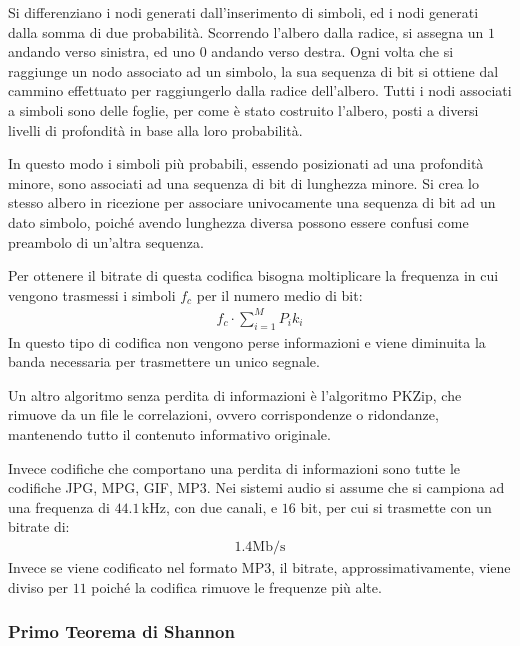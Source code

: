 \documentclass{article}
\numberwithin{equation}{subsection}
\begin{document}
Si differenziano i nodi generati dall'inserimento di simboli, ed i nodi generati dalla somma di due probabilità. Scorrendo l'albero dalla radice, si assegna un $1$ andando 
verso sinistra, ed uno $0$ andando verso destra. Ogni volta che si raggiunge un nodo associato ad un simbolo, la sua sequenza di bit si ottiene dal cammino 
effettuato per raggiungerlo dalla radice dell'albero. 
Tutti i nodi associati a simboli sono delle foglie, per come è stato costruito l'albero, posti a diversi livelli di profondità in base alla loro probabilità. 

In questo modo i simboli più probabili, essendo posizionati ad una profondità minore, sono associati ad una sequenza di bit di lunghezza minore. Si crea lo stesso albero in 
ricezione per associare univocamente una sequenza di bit ad un dato simbolo, poiché avendo lunghezza diversa possono essere confusi come preambolo di un'altra sequenza. 


Per ottenere il bitrate di questa codifica bisogna moltiplicare la frequenza in cui vengono trasmessi i simboli $f_c$ per il numero medio di bit:
\begin{gather*}
    f_c\cdot\displaystyle\sum_{i=1}^MP_ik_i
\end{gather*}
In questo tipo di codifica non vengono perse informazioni e viene diminuita la banda necessaria per trasmettere un unico segnale. 


Un altro algoritmo senza perdita di informazioni è l'algoritmo PKZip, che rimuove da un file le correlazioni, ovvero corrispondenze o ridondanze, mantenendo tutto il 
contenuto informativo originale.  

Invece codifiche che comportano una perdita di informazioni sono tutte le codifiche JPG, MPG, GIF, MP3. 
Nei sistemi audio si assume che si campiona ad una frequenza di $44.1\,$kHz, con due canali, e $16$ bit, per cui si trasmette con un bitrate di:
\begin{gather*}
    1.4\mathrm{Mb/s}
\end{gather*}
Invece se viene codificato nel formato MP3, il bitrate, approssimativamente, viene diviso per $11$ poiché la codifica rimuove le frequenze più alte. 

\subsubsection{Primo Teorema di Shannon}
\end{document}
